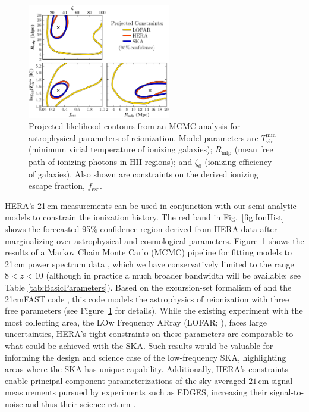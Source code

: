 \documentclass[preprint,11pt]{aastex}
\begin{document}
\begin{figure}[h!]
\centering
    \includegraphics[width=0.56\textwidth,clip]{plots/LikelihoodContours_smaller_avoid_All3_no_table}
  \caption{Projected likelihood contours from an MCMC analysis for astrophysical parameters of reionization. Model parameters are $T_\textrm{vir}^\textrm{min}$ (minimum virial temperature of ionizing galaxies); $R_\textrm{mfp}$ (mean free path of ionizing photons in HII regions); and $\zeta_0$ (ionizing efficiency of galaxies).  Also shown are constraints on the derived ionizing escape fraction, $f_\textrm{esc}$. }
	\label{fig:paramConstraints}
\end{figure}
 
HERA's 21\,cm measurements can be used in conjunction with our semi-analytic models to constrain the ionization history. 
The red band in Fig.~\ref{fig:IonHist} shows the forecasted 95\% confidence region derived from HERA data after marginalizing over astrophysical and cosmological parameters.
Figure~\ref{fig:paramConstraints} shows the results of a Markov Chain Monte
Carlo (MCMC) pipeline for fitting models to 21\,cm power spectrum data \citep{greig_and_mesinger2015}, which we have conservatively limited to the range $8 < z < 10$ (although in practice a much broader bandwidth will be available; see Table \ref{tab:BasicParameters}).
Based on the excursion-set formalism of
\citet{furlanetto_et_al2004} and the 21cmFAST code \citep{mesinger_et_al2011},
this code models the astrophysics of
reionization with three free parameters (see Figure~\ref{fig:paramConstraints} for details). 
While the existing experiment with the most collecting area, 
the LOw Frequency ARray (LOFAR; \citealt{yatawatta_et_al2013}),
faces large
uncertainties, 
HERA's tight constraints on these parameters are comparable
to what could be achieved with the SKA.  Such results would be valuable for
informing the design and science case of the low-frequency SKA, highlighting areas where the SKA has unique capability.
Additionally, HERA's constraints enable principal component parameterizations of the
sky-averaged $21\,\textrm{cm}$ signal measurements pursued by experiments such as EDGES, increasing their signal-to-noise and thus their science return \citep{liu_parsons2015}.
\end{document}
